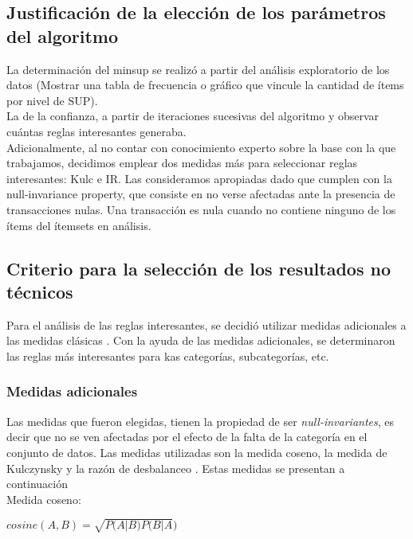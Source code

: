 \documentclass[]{article}
\begin{document}
\subsection{Justificación de la elección de los parámetros del algoritmo}
La determinación del minsup se realizó a partir del análisis exploratorio de los datos (Mostrar una tabla de frecuencia o gráfico que vincule la cantidad de ítems por nivel de SUP).\\

La de la confianza, a partir de iteraciones sucesivas del algoritmo y observar cuántas reglas interesantes generaba.\\

Adicionalmente, al no contar con conocimiento experto sobre la base con la que trabajamos, decidimos emplear dos medidas más para seleccionar reglas interesantes: Kulc e IR. Las consideramos apropiadas dado que cumplen con la null-invariance property, que consiste en no verse afectadas ante la presencia de transacciones nulas. Una transacción es nula cuando no contiene ninguno de los ítems del ítemsets en análisis.

\subsection{Criterio para la selección de los resultados no técnicos}

Para el análisis de las reglas interesantes, se decidió utilizar medidas adicionales a las medidas clásicas \cite{Tan:2005:IDM:1095618}. Con la ayuda de las medidas adicionales, se determinaron las reglas más interesantes para kas categorías, subcategorías, etc. 

\subsubsection{Medidas adicionales}
Las medidas que fueron elegidas, tienen la propiedad de ser \textit{null-invariantes}, es decir que no se ven afectadas por el efecto de la falta de la categoría en el conjunto de datos. Las medidas utilizadas son la medida coseno, la medida de Kulczynsky y la razón de desbalanceo \cite{Hall:2009:WDM:1656274.1656278}. Estas medidas se presentan a continuación\\

Medida coseno:

\begin{center}
	$cosine(A,B) = \sqrt{P(A|B) P(B|A})$
	\end{center}
	
\end{document}
